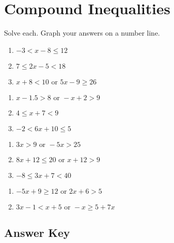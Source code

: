 \chapter{Compound Inequalities}

Solve each. Graph your answers on a number line. 

\begin{multicols}{3}
\begin{enumerate}
	\item $-3 < x-8 \leq 12$
	\item $7 \leq 2x - 5 < 18$
	\item $x + 8 < 10 \text{ or } 5x - 9 \geq 26$
\end{enumerate}	\setcounter{Review}{\value{enumi}}
\end{multicols}
\begin{multicols}{3}
\begin{enumerate}	\setcounter{enumi}{\value{Review}}
	\item $x - 1.5 > 8 \text{ or } -x + 2 > 9$
	\item $4 \leq x + 7 < 9$
	\item $-2 < 6x + 10 \leq 5$
\end{enumerate}	\setcounter{Review}{\value{enumi}}
\end{multicols}
\begin{multicols}{3}
\begin{enumerate}	\setcounter{enumi}{\value{Review}}
	\item $3x > 9 \text{ or } -5x > 25$
	\item $8x+12 \leq 20   \text{ or } x + 12 > 9$
	\item $-8 \leq 3x+7 < 40$
\end{enumerate}	\setcounter{Review}{\value{enumi}}
\end{multicols}
\begin{multicols}{3}
\begin{enumerate}	\setcounter{enumi}{\value{Review}}
	\item $-5x + 9 \geq 12 \text{ or } 2x+6 > 5$
	\item $3x - 1 < x + 5 \text{ or } -x \geq 5+7x$
\end{enumerate}	\setcounter{Review}{\value{enumi}}
\end{multicols}



\newpage

\section*{Answer Key}

